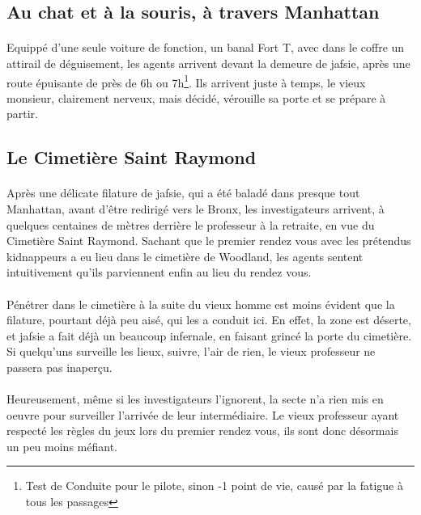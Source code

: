
\subsection{Au chat et à la souris, à travers Manhattan}

\paragraph{} Equippé d'une seule voiture de fonction, un banal Fort T, avec dans le coffre un attirail de déguisement, les 
agents arrivent devant la demeure de \gls{jafsie}, après une route épuisante de près de 6h ou 7h\footnote{Test de Conduite pour 
le pilote, sinon -1 point de vie, causé par la fatigue à tous les passages}. Ils arrivent juste à temps, le vieux monsieur, 
clairement nerveux, mais décidé, vérouille sa porte et se prépare à partir.



\subsection{Le Cimetière Saint Raymond}

\paragraph{} Après une délicate filature de \gls{jafsie}, qui a été baladé dans presque tout Manhattan, avant d'être redirigé 
vers le Bronx, les investigateurs arrivent, à quelques centaines de mètres derrière le professeur à la retraite, en vue du 
Cimetière Saint Raymond. Sachant que le premier rendez vous avec les prétendus kidnappeurs a eu lieu dans le cimetière de Woodland,
les agents sentent intuitivement qu'ils parviennent enfin au lieu du rendez vous.

\paragraph{} Pénétrer dans le cimetière à la suite du vieux homme est moins évident que la filature, pourtant déjà peu aisé, qui
les a conduit ici. En effet, la zone est déserte, et \gls{jafsie} a fait déjà un beaucoup infernale, en faisant grincé la porte du 
cimetière. Si quelqu'uns surveille les lieux, suivre, l'air de rien, le vieux professeur ne passera pas inaperçu. 

\paragraph{} Heureusement, même si les investigateurs l'ignorent, la secte n'a rien mis en oeuvre pour surveiller l'arrivée de 
leur intermédiaire. Le vieux professeur ayant respecté les règles du jeux lors du premier rendez vous, ils sont donc désormais un 
peu moins méfiant.

